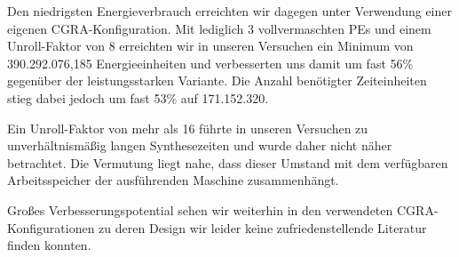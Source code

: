 \documentclass[parskip,
							 oneside,
							 11pt,
							 noheadingspace,
							 accentcolor=tud1d,
							 bigchapter,
							 colorback]{tudreport}
\begin{document}
Den niedrigsten Energieverbrauch erreichten wir dagegen unter Verwendung einer eigenen CGRA-Konfiguration. Mit lediglich 3 vollvermaschten PEs und einem Unroll-Faktor von 8 erreichten wir in unseren Versuchen ein Minimum von 390.292.076,185 Energieeinheiten und verbesserten uns damit um fast 56\% gegenüber der leistungsstarken Variante. Die Anzahl benötigter Zeiteinheiten stieg dabei jedoch um fast 53\% auf 171.152.320.

Ein Unroll-Faktor von mehr als 16 führte in unseren Versuchen zu unverhältnismäßig langen Synthesezeiten und wurde daher nicht näher betrachtet. Die Vermutung liegt nahe, dass dieser Umstand mit dem verfügbaren Arbeitsspeicher der ausführenden Maschine zusammenhängt.

Großes Verbesserungspotential sehen wir weiterhin in den verwendeten CGRA-Konfigurationen zu deren Design wir leider keine zufriedenstellende Literatur finden konnten.




\clearpage

\end{document}
